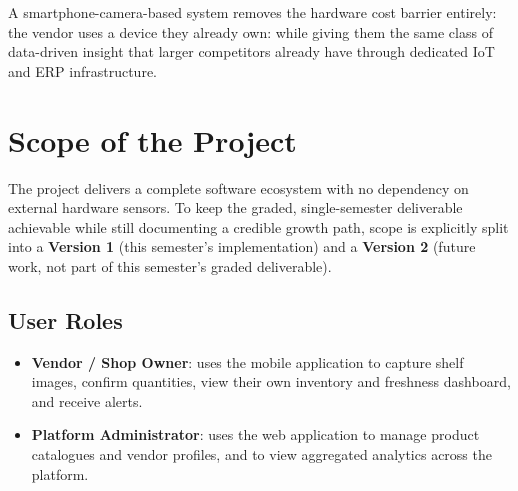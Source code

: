 \documentclass[12pt,a4paper]{article}
\begin{document}
A smartphone-camera-based system removes the hardware cost barrier entirely: the vendor uses a device they already own: while giving them the same class of data-driven insight that larger competitors already have through dedicated IoT and ERP infrastructure.

\section{Scope of the Project}
\label{sec:v1scope}

The project delivers a complete software ecosystem with no dependency on external hardware sensors. To keep the graded, single-semester deliverable achievable while still documenting a credible growth path, scope is explicitly split into a \textbf{Version 1} (this semester's implementation) and a \textbf{Version 2} (future work, not part of this semester's graded deliverable).

\subsection{User Roles}
\begin{itemize}[leftmargin=1.2cm]
    \item \textbf{Vendor / Shop Owner}: uses the mobile application to capture shelf images, confirm quantities, view their own inventory and freshness dashboard, and receive alerts.
    \item \textbf{Platform Administrator}: uses the web application to manage product catalogues and vendor profiles, and to view aggregated analytics across the platform.
\end{itemize}
\end{document}

